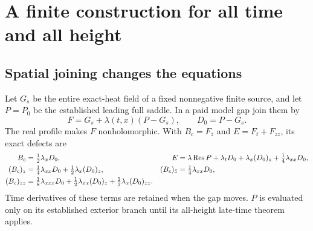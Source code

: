 \section{A finite construction for all time and all height}
\label{sec:global}

\subsection{Spatial joining changes the equations}
Let $G_s$ be the entire exact-heat field of a fixed nonnegative finite
source, and let $P=P_0$ be the established leading full saddle.
In a paid model gap join them by
\begin{equation}
 F=G_s+\lambda(t,x)(P-G_s),\qquad D_0=P-G_s.
 \label{eq:spatial-join}
\end{equation}
The real profile makes $F$ nonholomorphic. With $B_c=F_{\bar z}$ and
$E=F_t+F_{zz}$, its exact defects are
\begin{align}
 B_c&=\tfrac12\lambda_xD_0,&
 E&=\lambda\operatorname{Res} P+\lambda_tD_0+\lambda_x(D_0)_z
                                          +\tfrac14\lambda_{xx}D_0,\\
 (B_c)_z&=\tfrac14\lambda_{xx}D_0+\tfrac12\lambda_x(D_0)_z,&
 (B_c)_{\bar z}&=\tfrac14\lambda_{xx}D_0,\\
 (B_c)_{zz}&=\tfrac18\lambda_{xxx}D_0+\tfrac12\lambda_{xx}(D_0)_z
                                          +\tfrac12\lambda_x(D_0)_{zz}.
 \label{eq:spatial-defects}
\end{align}
Time derivatives of these terms are retained when the gap moves.
$P$ is evaluated only on its established exterior branch until its
all-height late-time theorem applies.

